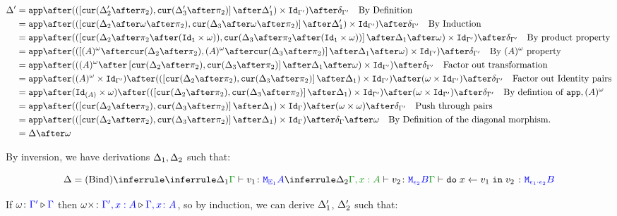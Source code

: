 \documentclass{report}
\begin{document}
\begin{align}
    \D' & =\app\after((\fld{\cur{\D_2'\after\pp}}{\cur{\D_3'\after\pp}}\after\D_1')\times \Id{\G'})\after\diag{\G'}\qt{By Definition}\\
    & =\app\after((\fld{\cur{\D_2\after\w\after\pp}}{\cur{\D_3\after\w\after\pp}}\after\D_1')\times \Id{\G'})\after\diag{\G'}\qt{By Induction}\\
    & = \app\after((\fld{\cur{\D_2\after\pp\after(\Id{\1}\times \w)}}{\cur{\D_3\after\pp\after(\Id{\1}\times \w)}}\after\D_1\after\w)\times \Id{\G'})\after\diag{\G'}\qt{By product property}\\
    & = \app\after((\fld{(A)^{\w}\after\cur{\D_2\after\pp}}{(A)^{\w}\after\cur{\D_3\after\pp}}\after\D_1\after\w)\times \Id{\G'})\after\diag{\G'}\qt{By $(A)^{\w}$ property}\\
    & = \app\after(((A)^{\w}\after\fld{\cur{\D_2\after\pp}}{\cur{\D_3\after\pp}}\after\D_1\after\w)\times \Id{\G'})\after\diag{\G'}\qt{Factor out transformation}\\
    & = \app\after((A)^{\w}\times\Id{\G'})\after((\fld{\cur{\D_2\after\pp}}{\cur{\D_3\after\pp}}\after\D_1)\times \Id{\G'})\after(\w \times \Id{\G'})\after\diag{\G'}\qt{Factor out Identity pairs}\\
    & = \app\after(\Id{(A)}\times\w)\after((\fld{\cur{\D_2\after\pp}}{\cur{\D_3\after\pp}}\after\D_1) \times \Id{\G'})\after(\w \times \Id{\G'})\after\diag{\G'}\qt{By defintion of $\app, (A)^{\w}$}\\
    & = \app\after((\fld{\cur{\D_2\after\pp}}{\cur{\D_3\after\pp}}\after\D_1)\times \idg)\after(\w \times \w)\after\diag{\G'}\qt{Push through pairs}\\
    & = \app\after((\fld{\cur{\D_2\after\pp}}{\cur{\D_3\after\pp}}\after\D_1)\times \idg)\after\diag{\G}\after\w\qt{By Definition of the diagonal morphism.}\\
    & = \D\after\w
\end{align}


By inversion, we have derivations $\Delta_1, \Delta_2$ such that:


\begin{equation}
    \D = \ntreeruleII{Bind}{
        \treeruleI{\D_1}{\typerelation{\G}{v_1}{\M{\E_1}{A}}}
        }{
        \treeruleI{\D_2}{\typerelation{\G,x: A}{v_2}{\M{\e_2}{B}}}
    }{
        \typerelation{\G}{\doin{x}{v_1}{v_2}}{\M{\e_1\dot\e_2}{B}}
    }
\end{equation}

If $\omega \colon {\color{blue}\Gamma'} \triangleright {\color {blue} \Gamma}$ then $\omega\times \colon {\color{blue}\Gamma',x:A} \triangleright {\color {blue} \Gamma, x\colon A}$, so by induction, we can derive $\Delta_1'$, $\Delta_2'$ such that:
\end{document}
